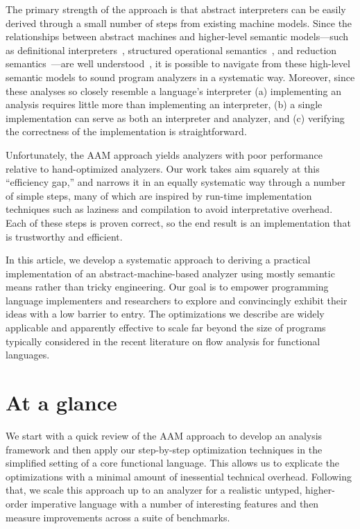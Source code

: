 \documentclass[9pt]{sigplanconf} %
\begin{document}
The primary strength of the approach is that abstract interpreters can be easily derived through a small number of steps from existing machine models.
%
Since the relationships between abstract machines and higher-level semantic models---such as definitional interpreters~\cite{dvanhorn:reynolds-hosc98}, structured operational semantics~\cite{dvanhorn:Plotkin1981Structural}, and reduction semantics~\cite{dvanhorn:Felleisen2009Semantics}---are well understood~\cite{dvanhorn:Danvy:DSc}, it is possible to navigate from these high-level semantic models to sound program analyzers in a systematic way.
%
Moreover, since these analyses so closely resemble a language's interpreter
%
(a) implementing an analysis requires little more than implementing an interpreter,
%
(b) a single implementation can serve as both an interpreter and analyzer, and
%
(c) verifying the correctness of the implementation is straightforward.

Unfortunately, the AAM approach yields analyzers with poor performance relative to hand-optimized analyzers.
%
Our work takes aim squarely at this ``efficiency gap,'' and narrows it in an equally systematic way through a number of simple steps, many of which are inspired by run-time implementation techniques such as laziness and compilation to avoid interpretative overhead.
%
Each of these steps is proven correct, so the end result is an implementation that is trustworthy and efficient.

In this article, we develop a systematic approach to deriving a practical implementation of an abstract-machine-based analyzer using mostly semantic means rather than tricky engineering.
%
Our goal is to empower programming language implementers and researchers to explore and convincingly exhibit their ideas with a low barrier to entry.
%
The optimizations we describe are widely applicable and apparently effective to scale far beyond the size of programs typically considered in the recent literature on flow analysis for functional languages.

\section{At a glance}

We start with a quick review of the AAM approach to develop an analysis framework and then apply our step-by-step optimization techniques in the simplified setting of a core functional language.
%
This allows us to explicate the optimizations with a minimal amount of inessential technical overhead.
%
Following that, we scale this approach up to an analyzer for a realistic untyped, higher-order imperative language with a number of interesting features and then measure improvements across a suite of benchmarks.
\end{document}
